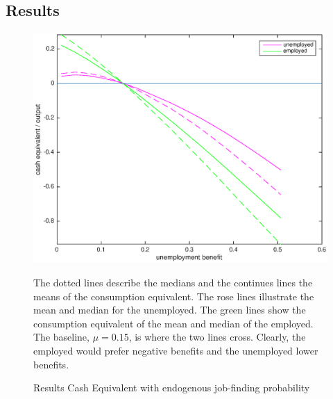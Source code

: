 \documentclass[a4paper,12pt]{article}
\begin{document}
\subsection{Results}
\begin{figure}
\caption{Results Cash Equivalent with endogenous job-finding probability} 
\label{baseline_ue_vs_e}	%
\centering
\includegraphics[scale=.7]{cash_equivalent(ue_vs_e)}  %

\begin{minipage}{0.8\linewidth}
\footnotesize{The dotted lines describe the medians and the continues lines the means of the consumption equivalent. The rose lines illustrate the mean and median for the unemployed. The green lines show the consumption equivalent of the mean and median of the employed. The baseline, $\mu = 0.15$, is where the two lines cross. Clearly, the employed would prefer negative benefits and the unemployed lower benefits. }
\end{minipage}

\end{figure}
\end{document}
